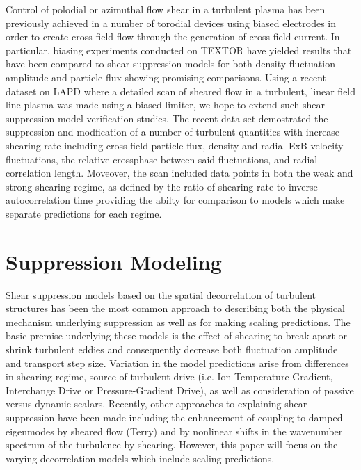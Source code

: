 \documentclass[aip,pop,amsmath,amssymb,reprint,superscriptaddress]{revtex4-1} %
\begin{document}
Control of polodial or azimuthal flow shear in a turbulent plasma has been previously achieved in a number of torodial devices using biased electrodes in order to create cross-field flow through the generation of cross-field current. In particular, biasing experiments conducted on TEXTOR have yielded results that have been compared to shear suppression models for both density fluctuation amplitude and particle flux showing promising comparisons. Using a recent dataset on LAPD where a detailed scan of sheared flow in a turbulent, linear field line plasma was made using a biased limiter, we hope to extend such shear suppression model verification studies. The recent data set demostrated the suppression and modfication of a number of turbulent quantities with increase shearing rate including cross-field particle flux, density and radial ExB velocity fluctuations, the relative crossphase between said fluctuations, and radial correlation length. Moveover, the scan included data points in both the weak and strong shearing regime, as defined by the ratio of shearing rate to inverse autocorrelation time providing the abilty for comparison to models which make separate predictions for each regime.

\section{Suppression Modeling}

Shear suppression models based on the spatial decorrelation of turbulent structures has been the most common approach to describing both the physical mechanism underlying suppression as well as for making scaling predictions. The basic premise underlying these models is the effect of shearing to break apart or shrink turbulent eddies and consequently decrease both fluctuation amplitude and transport step size. Variation in the model predictions arise from differences in shearing regime, source of turbulent drive (i.e. Ion Temperature Gradient, Interchange Drive or Pressure-Gradient Drive), as well as consideration of passive versus dynamic scalars. Recently, other approaches to explaining shear suppression have been made including the enhancement of coupling to damped eigenmodes by sheared flow (Terry) and by nonlinear shifts in the wavenumber spectrum of the turbulence by shearing. However, this paper will focus on the varying decorrelation models which include scaling predictions. 
\end{document}

